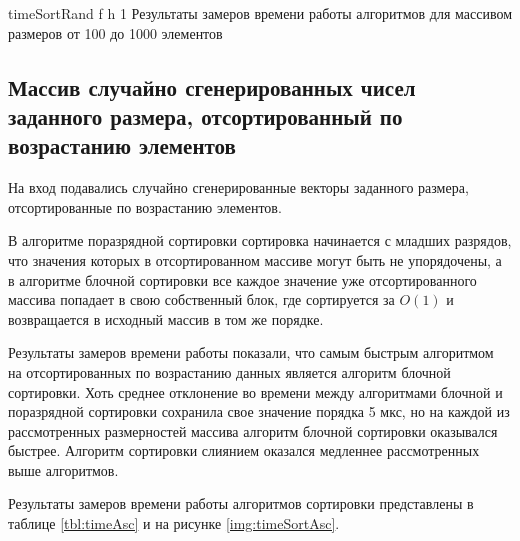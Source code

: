 \clearpage

{timeSortRand} %
{f} %
{h} %
{1\textwidth} %
{Результаты замеров времени работы алгоритмов для массивом размеров от 100 до 1000 элементов} %

\subsection{Массив случайно сгенерированных чисел заданного размера, отсортированный по возрастанию элементов}

На вход подавались случайно сгенерированные векторы заданного размера, отсортированные по возрастанию элементов.

В алгоритме поразрядной сортировки сортировка начинается с младших разрядов, что значения которых в отсортированном массиве могут быть не упорядочены, а в алгоритме блочной сортировки все каждое значение уже отсортированного массива попадает в свою собственный блок, где сортируется за $O(1)$ и возвращается в исходный массив в том же порядке.

Результаты замеров времени работы показали, что самым быстрым алгоритмом на отсортированных по возрастанию данных является алгоритм блочной сортировки. Хоть среднее отклонение во времени между алгоритмами блочной и поразрядной сортировки сохранила свое значение порядка 5 мкс, но на каждой из рассмотренных размерностей массива алгоритм блочной сортировки оказывался быстрее. Алгоритм сортировки слиянием оказался медленнее рассмотренных выше алгоритмов.

Результаты замеров времени работы алгоритмов сортировки представлены в таблице \ref{tbl:timeAsc} и на рисунке \ref{img:timeSortAsc}.

